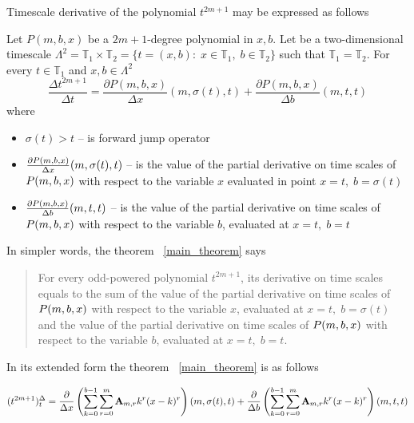 Timescale derivative of the polynomial $t^{2m+1}$ may be expressed as follows
\begin{thm}
    \label{main_theorem}
    Let $P(m,b,x)$ be a $2m+1$-degree polynomial in $x,b$.
    Let be a two-dimensional timescale
    $\Lambda^2 = \mathbb{T}_1 \times \mathbb{T}_2 = \{t=(x, b) \colon \; x\in\mathbb{T}_1, \; b\in\mathbb{T}_2 \}$
    such that $\mathbb{T}_1 = \mathbb{T}_2$.
    For every $t\in\mathbb{T}_1$ and $x,b\in \Lambda^2$
    \[
        \frac{\Delta t^{2m+1}}{\Delta t} =
        \frac{\partial P(m,b,x)}{\Delta x} (m, \sigma(t), t) +
        \frac{\partial P(m,b,x)}{\Delta b} (m, t, t)
    \]
    where
    \begin{itemize}
        \setlength\itemsep{1em}
        \item  $\sigma(t) > t$ -- is forward jump operator

        \item $\frac{\partial P ( m, b, x )}{\Delta x} (m, \sigma(t), t)$ --
        is the value of the partial derivative on time scales of
        $P ( m, b, x )$ with respect to the variable $x$ evaluated in point $x = t, \; b = \sigma(t)$

        \item $\frac{\partial P ( m, b, x )}{\Delta b} (m, t, t)$ --
        is the value of the partial derivative on time scales of
        $P ( m, b, x )$ with respect to the variable $b$, evaluated at $x = t, \; b = t$
    \end{itemize}
\end{thm}
In simpler words, the theorem ~\ref{main_theorem} says
\begin{center}
    \begin{quotation}
        For every odd-powered polynomial $t^{2m+1}$, its derivative on time scales equals to the sum
        of the value of the partial derivative on time scales of
        $P ( m, b, x )$
        with respect to the variable
        $x$,
        evaluated at
        $x = t, \; b = \sigma(t)$
        and the value of the partial derivative on time scales of
        $P ( m, b, x )$
        with respect to the variable
        $b$,
        evaluated at
        $x = t, \; b = t$.
    \end{quotation}
\end{center}

In its extended form the theorem ~\ref{main_theorem} is as follows

\begin{align*}
(t^{2m+1})
    ^{\Delta}_{t} =
    \frac{\partial}{\Delta x} \left( \sum_{k=0}^{b-1} \sum_{r=0}^{m} {\mathbf{A}} \sb{m,r} k^r(x-k)^r \right) (m, \sigma(t), t)
    + \frac{\partial}{\Delta b} \left( \sum_{k=0}^{b-1} \sum_{r=0}^{m} {\mathbf{A}} \sb{m,r} k^r(x-k)^r \right) (m, t, t)
\end{align*}
